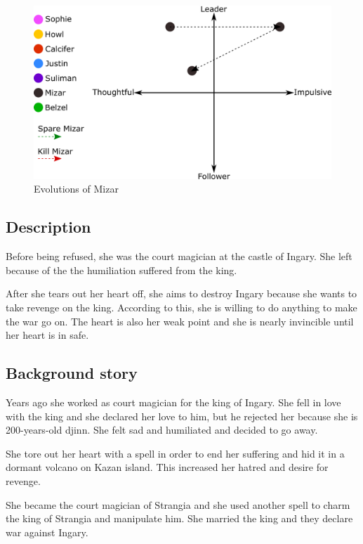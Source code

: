 \begin{figure}[H]
  \centering
  \includegraphics[width=14cm]{Images/Diagrams/Evolutions/mizarEvolution}
  \caption{Evolutions of Mizar}
\end{figure}

\subsection{Description}
Before being refused, she was the court magician at the castle of Ingary. She left because of the the humiliation suffered from the king.

After she tears out her heart off, she aims to destroy Ingary because she wants to take revenge on the king. According to this, she is willing to do anything to make the war go on. The heart is also her weak point and she is nearly invincible until her heart is in safe.

\subsection{Background story}
Years ago she worked as court magician for the king of Ingary. She fell in love with the king and she declared her love to him, but he rejected her because she is 200-years-old djinn. She felt sad and humiliated and decided to go away.

She tore out her heart with a spell in order to end her suffering and hid it in a dormant volcano on Kazan island. This increased her hatred and desire for revenge.

She became the court magician of Strangia and she used another spell to charm the king of Strangia and manipulate him. She married the king and they declare war against Ingary.
